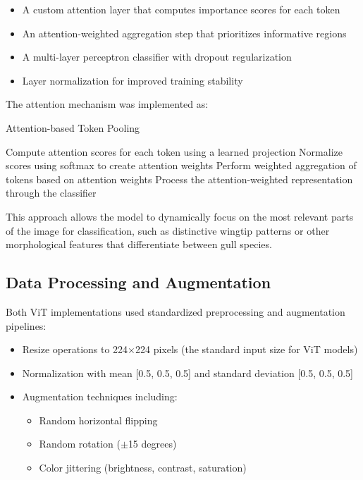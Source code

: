 \begin{itemize}
    \item A custom attention layer that computes importance scores for each token
    \item An attention-weighted aggregation step that prioritizes informative regions
    \item A multi-layer perceptron classifier with dropout regularization
    \item Layer normalization for improved training stability
\end{itemize}

The attention mechanism was implemented as:

\begin{algorithm}
\caption{Attention-based Token Pooling}
\begin{algorithmic}[1]
\State Compute attention scores for each token using a learned projection
\State Normalize scores using softmax to create attention weights
\State Perform weighted aggregation of tokens based on attention weights
\State Process the attention-weighted representation through the classifier
\end{algorithmic}
\end{algorithm}

This approach allows the model to dynamically focus on the most relevant parts of the image for classification, such as distinctive wingtip patterns or other morphological features that differentiate between gull species.

\subsection{Data Processing and Augmentation}

Both ViT implementations used standardized preprocessing and augmentation pipelines:

\begin{itemize}
    \item Resize operations to 224$\times$224 pixels (the standard input size for ViT models)
    \item Normalization with mean [0.5, 0.5, 0.5] and standard deviation [0.5, 0.5, 0.5]
    \item Augmentation techniques including:
    \begin{itemize}
        \item Random horizontal flipping
        \item Random rotation ($\pm$15 degrees)
        \item Color jittering (brightness, contrast, saturation)
    \end{itemize}
\end{itemize}

